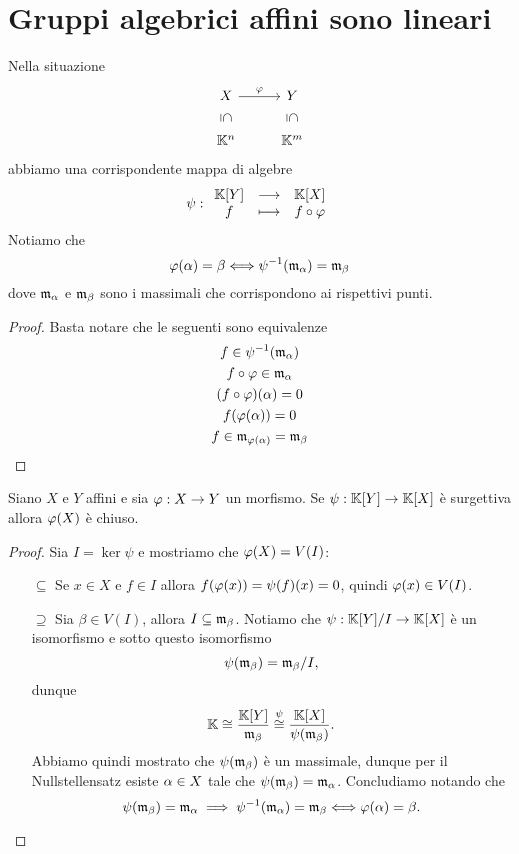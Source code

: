 \section{Gruppi algebrici affini sono lineari}
\begin{remark}\label{RmPuntiEMassimaliSonoLaStessaCosa}
Nella situazione
\[\begin{tikzcd}
	X & Y \\
	{\K^n} & {\K^m}
	\arrow["\vp", from=1-1, to=1-2]
	\arrow["\subseteq"{marking, allow upside down}, draw=none, from=1-1, to=2-1]
	\arrow["\subseteq"{marking, allow upside down}, draw=none, from=1-2, to=2-2]
\end{tikzcd}\]
abbiamo una corrispondente mappa di algebre
\[\psi:\begin{array}{ccc} {\mathbb{K}[Y]} & \longrightarrow & {\mathbb{K}[X]}\\ {f} & \longmapsto & {f\circ \varphi} \end{array}\]
Notiamo che
\[\varphi(\alpha)=\beta\Longleftrightarrow \psi^{-1}(\mathfrak{m}_\alpha)=\mathfrak{m}_\beta\]
dove $\mathfrak{m}_\alpha$ e $\mathfrak{m}_\beta$ sono i massimali che corrispondono ai rispettivi punti.
\end{remark}
\begin{proof}
Basta notare che le seguenti sono equivalenze
\begin{gather*}
    f\in\psi^{-1}(\mathfrak{m}_\alpha)\\
    f\circ \varphi\in \mathfrak{m}_\alpha\\
    (f\circ \varphi)(\alpha)=0\\
    f(\varphi(\alpha))=0\\
    f\in \mathfrak{m}_{\varphi(\alpha)}=\mathfrak{m}_\beta
\end{gather*}
\end{proof}

\begin{proposition}\label{PrImmagineChiusaSeTraAlgebraSurgettiva}
Siano $X$ e $Y$ affini e sia $\varphi:X\to Y$ un morfismo. Se $\psi:\mathbb{K}[Y]\to \mathbb{K}[X]$ \`e surgettiva allora $\varphi(X)$ \`e chiuso.
\end{proposition}
\begin{proof}
Sia $I=\ker\psi$ e mostriamo che $\varphi(X)=V(I)$:
\setlength{\leftmargini}{0cm}
\begin{itemize}
\item[$\boxed{\subseteq}$] Se $x\in X$ e $f\in I$ allora $f(\varphi(x))=\psi(f)(x)=0$, quindi $\varphi(x)\in V(I)$.
\item[$\boxed{\supseteq}$] Sia $\beta\in V(I)$, allora $I\subseteq \mathfrak{m}_\beta$. Notiamo che $\psi:\mathbb{K}[Y]/I\to \mathbb{K}[X]$ \`e un isomorfismo e sotto questo isomorfismo
\[\psi(\mathfrak{m}_\beta)=\mathfrak{m}_\beta/I,\]
dunque
\[\mathbb{K}\cong \frac{\mathbb{K}[Y]}{\mathfrak{m}_\beta}\overset\psi\cong\frac{\mathbb{K}[X]}{\psi(\mathfrak{m}_\beta)}.\]
Abbiamo quindi mostrato che $\psi(\mathfrak{m}_\beta)$ \`e un massimale, dunque per il Nullstellensatz esiste $\alpha\in X$ tale che $\psi(\mathfrak{m}_\beta)=\mathfrak{m}_\alpha$. Concludiamo notando che
\[\psi(\mathfrak{m}_\beta)=\mathfrak{m}_\alpha\implies \psi^{-1}(\mathfrak{m}_\alpha)=\mathfrak{m}_\beta\Longleftrightarrow \varphi(\alpha)=\beta.\]
\end{itemize}
\setlength{\leftmargini}{0.5cm}
\end{proof}

